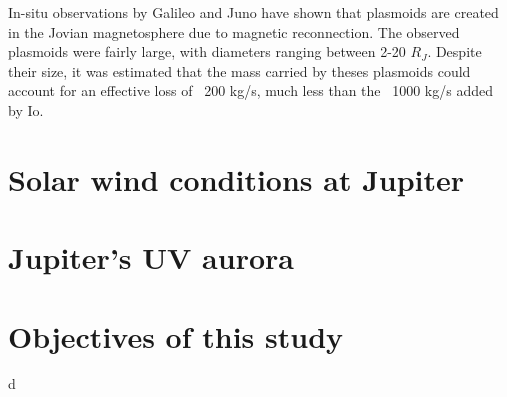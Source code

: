 In-situ observations by Galileo and Juno have shown that plasmoids are created in the Jovian magnetosphere due to magnetic reconnection. The observed plasmoids were fairly large, with diameters ranging between 2-20 $R_J$. Despite their size, it was estimated that the mass carried by theses plasmoids could account for an effective loss of ~200 kg/s, much less than the ~1000 kg/s added by Io. 


\section{Solar wind conditions at Jupiter}

\section{Jupiter's UV aurora}

\section{Objectives of this study}d


